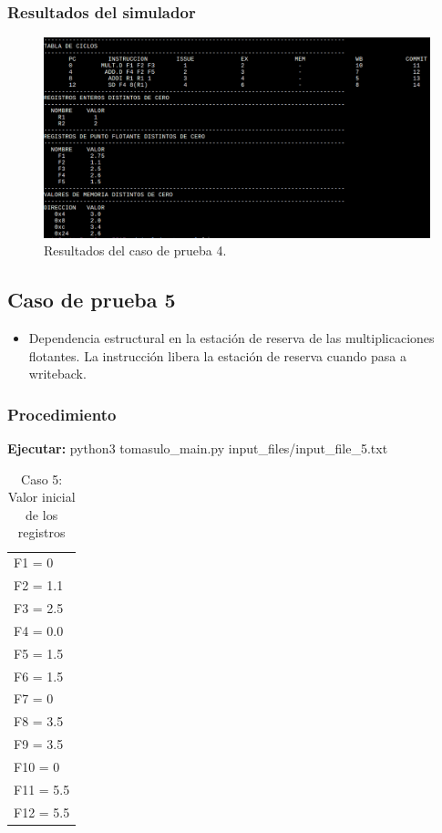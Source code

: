 \documentclass[a4paper]{article}
\begin{document}
	\subsubsection*{Resultados del simulador}

	\begin{figure}[H]
	\centering
	\includegraphics[width=1\textwidth]{figures/test4.png}
	\caption{\label{fig:bloques}Resultados del caso de prueba 4.}
	\end{figure}


	\subsection*{Caso de prueba 5}

	\begin{itemize}
		\item Dependencia estructural en la estación de reserva de las multiplicaciones flotantes. La instrucción libera la estación de reserva cuando pasa a writeback.  
	\end{itemize}

	\subsubsection*{Procedimiento}

	\textbf{Ejecutar:} python3 tomasulo\_main.py input\_files/input\_file\_5.txt

	\begin{table}[H]
		\centering
		\caption*{Caso 5: Valor inicial de los registros}
		\begin{tabular}{l}
			F1 = 0 \\
			F2 = 1.1 \\
			F3 = 2.5 \\
			F4 = 0.0 \\
			F5 = 1.5 \\
			F6 = 1.5 \\
			F7 = 0 \\
			F8 = 3.5 \\
			F9 = 3.5 \\
			F10 = 0 \\
			F11 = 5.5 \\
			F12 = 5.5
		\end{tabular}
	\end{table}
\end{document}
